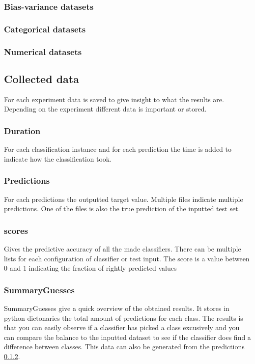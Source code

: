 \documentclass[a4paper,10pt]{article}
\begin{document}
\subsubsection{Bias-variance datasets}

\subsubsection{Categorical datasets}

\subsubsection{Numerical datasets}

\subsection{Collected data}
For each experiment data is saved to give insight to what the results are. Depending on the experiment different data is important or stored. 
\subsubsection{Duration}
For each classification instance and for each prediction the time is added to indicate how the classification took. 

\subsubsection{Predictions}\label{pred}
For each predictions the outputted target value. Multiple files indicate multiple predictions. One of the files is also the true prediction of the inputted test set. 

\subsubsection{scores}
Gives the predictive accuracy of all the made classifiers. There can be multiple lists for each configuration of classifier or test input. The score is a value between 0 and 1 indicating the fraction of rightly predicted values

\subsubsection{SummaryGuesses}
SummaryGuesses give a quick overview of the obtained results. It stores in python dictonaries the total amount of predictions for each class. The results is that you can easily observe if a classifier has picked a class excusively and you can compare the balance to the inputted dataset to see if the classifier does find a difference between classes. This data can also be generated from the predictions \ref{pred}.
\end{document}
